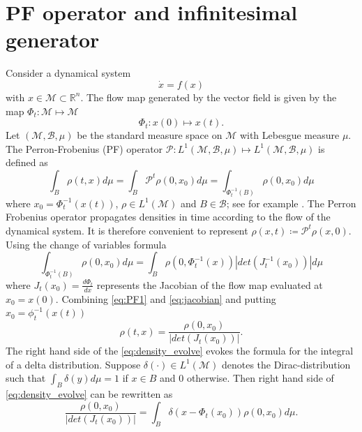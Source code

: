 \documentclass[pdflatex,sn-mathphys]{sn-jnl}%
\theoremstyle{thmstyleone}%
\theoremstyle{thmstyletwo}%
\theoremstyle{thmstylethree}%
\begin{document}
\section{PF operator and infinitesimal generator}\label{sec:1}
Consider a dynamical system 
\begin{equation}\label{eq:vf}
    \dot{x} = f(x)
\end{equation}
with $x\in \mathcal{M} \subset \mathbb{R}^n$. The flow map generated by the vector field is given by the map $\Phi_t : \mathcal{M} \mapsto \mathcal{M}$ 
\begin{equation}\label{eq:flow}
    \Phi_t: x(0) \mapsto x(t).
\end{equation}
Let $(\mathcal{M}, \mathcal{B}, \mu)$ be the standard measure space on $\mathcal{M}$ with Lebesgue measure $\mu$. The Perron-Frobenius (PF) operator $\mathcal{P} : L^1(\mathcal{M},\mathcal{B}, \mu) \mapsto L^1(\mathcal{M},\mathcal{B}, \mu)$ is defined as 
\begin{equation}\label{eq:PF1}
   \int_B  \rho(t,x) d\mu =\int_B \mathcal{P}^t \rho(0,x_0) d\mu = \int_{\Phi^{-1}_t(B) } \rho(0,x_0) d\mu
\end{equation}
where $x_0 = \Phi^{-1}_t(x(t))$, $\rho \in L^1(\mathcal{M})$ and $B \in \mathcal{B}$; see for example \cite{lasota_1994, cvitanovic_chaosbook}. The Perron Frobenius operator propagates densities in time according to the flow of the dynamical system. It is therefore convenient to represent $\rho(x,t) \coloneqq \mathcal{P}^t \rho(x,0)$. Using the change of variables formula
\begin{equation}\label{eq:jacobian}
\int_{\Phi^{-1}_t(B) } \rho(0,x_0) d\mu = \int_B \rho(0,\Phi^{-1}_t(x)) |det(J^{-1}_t(x_0))| d\mu
\end{equation}
where $J_t(x_0) = \frac{d\Phi_t}{dx}$ represents the Jacobian of the flow map evaluated at $x_0 = x(0)$. Combining \eqref{eq:PF1} and \eqref{eq:jacobian} and putting $x_0 = \phi^{-1}_t(x(t))$
\begin{equation}\label{eq:density_evolve}
    \rho(t,x) = \frac{\rho (0,x_0)}{|det(J_t(x_0))|}.
\end{equation}
The right hand side of the \eqref{eq:density_evolve} evokes the formula for the integral of a delta distribution. Suppose $\delta(\cdot) \in L^1(\mathcal{M})$ denotes the Dirac-distribution such that $\int_B \delta(y)d\mu = 1$ if $x \in B$ and $0$ otherwise. Then right hand side of  \eqref{eq:density_evolve} can be rewritten as
\begin{equation}\label{eq:delta}
    \frac{\rho (0,x_0)}{|det(J_t(x_0))|}=  \int_B \delta(x-\Phi_t(x_0)) \rho(0,x_0) d\mu.
\end{equation}
\end{document}
